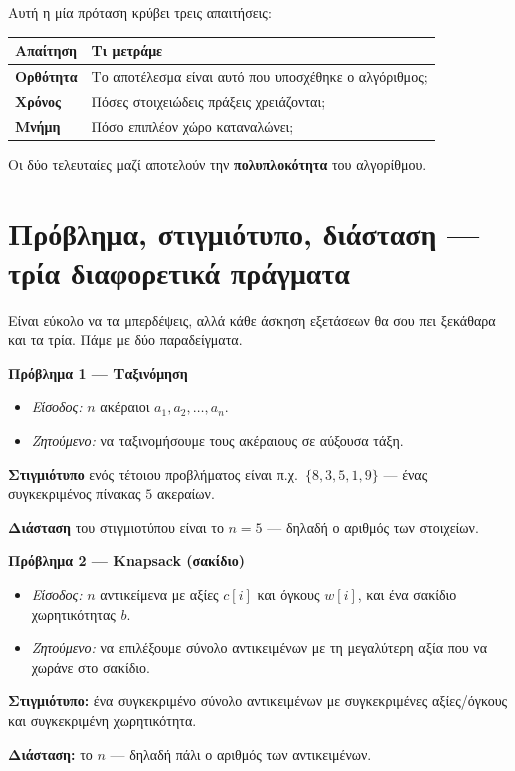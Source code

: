 \documentclass[11pt,a4paper]{article}
\begin{document}
Αυτή η μία πρόταση κρύβει τρεις απαιτήσεις:

\begin{center}
\begin{tabular}{@{}p{3.2cm} p{9.5cm}@{}}
\toprule
\textbf{Απαίτηση} & \textbf{Τι μετράμε} \\
\midrule
\textbf{Ορθότητα} & Το αποτέλεσμα είναι αυτό που υποσχέθηκε ο αλγόριθμος; \\
\textbf{Χρόνος}   & Πόσες στοιχειώδεις πράξεις χρειάζονται; \\
\textbf{Μνήμη}    & Πόσο επιπλέον χώρο καταναλώνει; \\
\bottomrule
\end{tabular}
\end{center}

Οι δύο τελευταίες μαζί αποτελούν την \textbf{πολυπλοκότητα} του αλγορίθμου.

\section{Πρόβλημα, στιγμιότυπο, διάσταση --- τρία διαφορετικά πράγματα}

Είναι εύκολο να τα μπερδέψεις, αλλά κάθε άσκηση εξετάσεων θα σου πει ξεκάθαρα και
τα τρία. Πάμε με δύο παραδείγματα.

\begin{examplebox}
\textbf{Πρόβλημα 1 --- Ταξινόμηση}
\begin{itemize}
  \item \textit{Είσοδος:} $n$ ακέραιοι $a_1, a_2, \dots, a_n$.
  \item \textit{Ζητούμενο:} να ταξινομήσουμε τους ακέραιους σε αύξουσα τάξη.
\end{itemize}

\textbf{Στιγμιότυπο} ενός τέτοιου προβλήματος είναι π.χ.\ $\{8, 3, 5, 1, 9\}$ ---
ένας συγκεκριμένος πίνακας $5$ ακεραίων.

\textbf{Διάσταση} του στιγμιοτύπου είναι το $n = 5$ --- δηλαδή ο αριθμός των
στοιχείων.
\end{examplebox}

\begin{examplebox}
\textbf{Πρόβλημα 2 --- Knapsack (σακίδιο)}
\begin{itemize}
  \item \textit{Είσοδος:} $n$ αντικείμενα με αξίες $c[i]$ και όγκους $w[i]$, και
  ένα σακίδιο χωρητικότητας $b$.
  \item \textit{Ζητούμενο:} να επιλέξουμε σύνολο αντικειμένων με τη μεγαλύτερη
  αξία που να χωράνε στο σακίδιο.
\end{itemize}

\textbf{Στιγμιότυπο:} ένα συγκεκριμένο σύνολο αντικειμένων με συγκεκριμένες
αξίες/όγκους και συγκεκριμένη χωρητικότητα.

\textbf{Διάσταση:} το $n$ --- δηλαδή πάλι ο αριθμός των αντικειμένων.
\end{examplebox}
\end{document}
